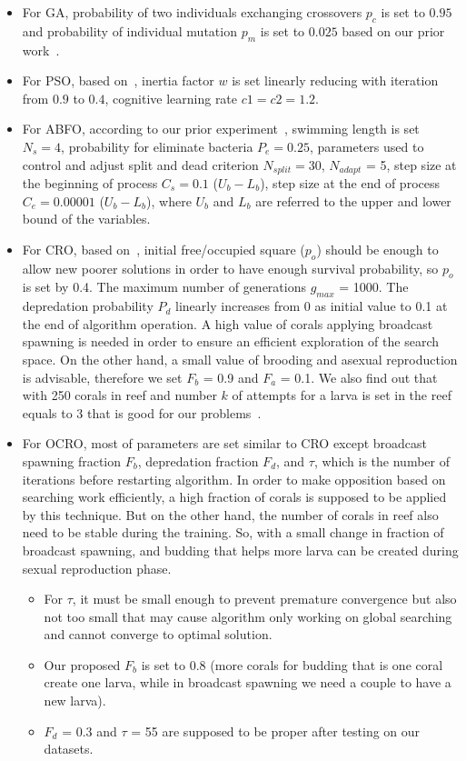 \documentclass[smallcondensed, natbib]{svjour3}     %
\begin{document}
\begin{itemize}
\item For GA, probability of two individuals exchanging crossovers $p_c$ is set to $0.95$ and probability of individual mutation $p_m$ is set to $0.025$ based on our prior work~\citep{ref_thieu}. 
\item For PSO, based on~\citep{ref_shi2001particle}, inertia factor $w$ is set linearly reducing with iteration from $0.9$ to $0.4$, cognitive learning rate $c1 = c2 = 1.2$.
\item For ABFO, according to our prior experiment~\cite{ref_thieu}, swimming length is set $N_s=4$, probability for eliminate bacteria $P_e=0.25$, parameters used to control and adjust split and dead criterion $N_{split}=30$, $N_{adapt}$ = 5, step size at the beginning of process $C_s= 0.1$ ($U_b - L_b$), step size at the end of process $C_e=0.00001$ ($U_b - L_b$), where $U_b$ and $L_b$ are referred to the upper and lower bound of the variables.
\item For CRO, based on~\citep{ref_salcedo_sanz1}, initial free/occupied square ($p_{o}$) should be enough to allow new poorer solutions in order to have enough survival probability, so $p_{o}$ is set by 0.4. The maximum number of generations $g_{max}$ = 1000. The depredation probability $P_{d}$ linearly increases from 0 as initial value to 0.1 at the end of algorithm operation. A high value of corals applying broadcast spawning is needed in order to ensure an efficient exploration of the search space. On the other hand, a small value of brooding and asexual reproduction is advisable, therefore we set $F_{b}$ = 0.9 and $F_{a}$ = 0.1. 
We also find out that with 250 corals in reef and number $k$ of attempts for a larva is set in the reef equals to 3 that is good for our problems~\citep{ref_salcedo_sanz1}.
\item For OCRO, most of parameters are set similar to CRO except broadcast spawning fraction $F_{b}$, depredation fraction $F_{d}$, and $\tau$, which is the number of iterations before restarting algorithm. In order to make opposition based on searching work efficiently, a high fraction of corals is supposed to be applied by this technique. But on the other hand, the number of corals in reef also need to be stable during the training. So, with a small change in fraction of broadcast spawning, and budding that helps more larva can be created during sexual reproduction phase.
	\begin{itemize} 
		\item For $\tau$, it must be small enough to prevent premature convergence but also not too small that may cause algorithm only working on global searching and cannot converge to optimal solution. 
		\item Our proposed $F_{b}$ is set to 0.8 (more corals for budding that is one coral create one larva, while in broadcast spawning we need a couple to have a new larva).
		\item $F_{d}$ = 0.3 and $\tau$ = 55 are supposed to be proper after testing on our datasets.
	\end{itemize}
\end{itemize}
\end{document}
